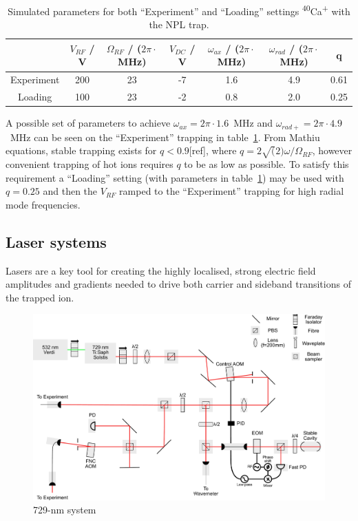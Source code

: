 \documentclass[12pt]{iopart}
\begin{document}
\begin{table}[h!]
\begin{center}
\begin{tabular}{ c|c c c c c c }
   & $V_{RF}$ / V & $\Omega_{RF}$ / ($2\pi\cdot$MHz)& $V_{DC}$ / V & $\omega_{ax}$ / ($2\pi\cdot$MHz) & $\omega_{rad}$ / ($2\pi\cdot$MHz) & q \\ 
  \hline
  Experiment  & 200 & 23 & -7 & 1.6 & 4.9 & 0.61 \\
  Loading  & 100 & 23 & -2 & 0.8 & 2.0 & 0.25 \\
\end{tabular}
\caption{ Simulated parameters for both ``Experiment'' and ``Loading'' settings \textsuperscript{40}Ca\textsuperscript{+} with the NPL trap.
  }
\end{center}
\label{table:freqs}
\end{table}
A possible set of parameters to achieve $\omega_{ax} = 2\pi \cdot
1.6$~MHz and $\omega_{rad+} = 2\pi \cdot 4.9$~MHz can be seen on the
``Experiment'' trapping in table~\ref{table:freqs}.  From Mathiu
equations, stable trapping exists for $q < 0.9$[ref], where
$q=2\sqrt(2)\omega/\Omega_{RF}$, however convenient trapping of hot
ions requires $q$ to be as low as possible. To satisfy this
requirement a ``Loading'' setting (with parameters in
table~\ref{table:freqs}) may be used with $q = 0.25$ and then the
$V_{RF}$ ramped to the ``Experiment'' trapping for high radial mode
frequencies.

\subsection{Laser systems}

Lasers are a key tool for creating the highly localised, strong
electric field amplitudes and gradients needed to drive both carrier
and sideband transitions of the trapped ion.\\


\begin{figure}
  \begin{center}
   \noindent\includegraphics[width=\linewidth]{figures/729_path_small.pdf}
  \end{center}
  \caption{729-nm system}
  \label{fig:729}
\end{figure}
\end{document}
